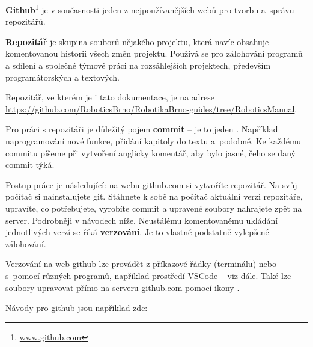 {\bf Github}\footnote{\url{www.github.com}}  je v současnosti jeden z nejpoužívanějších webů pro tvorbu a~správu repozitářů.

{\bf Repozitář}  je skupina souborů nějakého projektu, která navíc obsahuje komentovanou historii všech změn projektu. Používá se pro zálohování programů a sdílení a společné týmové práci na rozsáhlejších projektech, především programátorských a textových. 

Repozitář, ve kterém je i tato dokumentace, je na adrese 
\url{https://github.com/RoboticsBrno/RobotikaBrno-guides/tree/RoboticsManual}.   

Pro práci s repozitáři je důležitý pojem {\bf commit}  -- je to jeden . 
Například naprogramování  nové funkce, přidání kapitoly do textu a~podobně. 
Ke každému commitu píšeme při vytvoření anglicky komentář, aby bylo jasné, čeho se daný commit týká.

Postup práce je následující: na webu github.com si vytvoříte repozitář. Na svůj počítač si nainstalujete git. Stáhnete k sobě na počítač aktuální verzi repozitáře, upravíte, co potřebujete, vyrobíte commit a upravené soubory nahrajete zpět na server. Podrobněji v návodech níže. 
Neustálému komentovanému ukládání jednotlivých verzí se říká {\bf verzování}. Je to vlastně podstatně vylepšené zálohování.

Verzování na web github lze provádět z příkazové řádky (terminálu) nebo s~pomocí různých programů, například prostředí \hyperref[vscode]{VSCode} -- viz dále. 
Také lze soubory upravovat přímo na serveru github.com pomocí ikony .

Návody pro github jsou například zde: 

